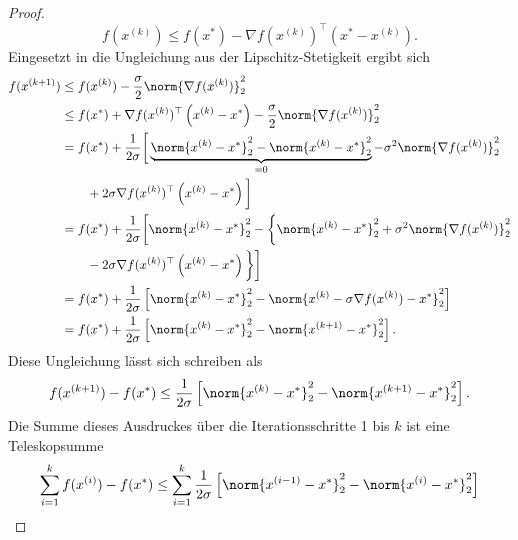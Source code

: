 \begin{proof}
      \begin{equation*}
        f(x^{(k)}) \leq f(x^\ast) - \nabla f(x^{(k)})^\top \left(x^\ast - x^{(k)}\right) \text{.}
      \end{equation*}
      Eingesetzt in die Ungleichung aus der Lipschitz-Stetigkeit ergibt sich
      \begin{gather*}
        			\begin{aligned}
                f(x^{(k+1)}) &  \leq f(x^{(k)}) - \frac{\sigma}{2} \norm{\nabla f(x^{(k)})}^2_2 \\
                & \leq f(x^\ast) + \nabla f(x^{(k)})^\top \left(x^{(k)}-x^\ast\right) - \frac{\sigma}{2} \norm{\nabla f(x^{(k)})}^2_2\\
                & = f(x^\ast) + \frac{1}{2\sigma} \bigg[ \underbrace{\norm{x^{(k)}-x^\ast}^2_2-\norm{x^{(k)}-x^\ast}^2_2}_{=0} - \sigma^2 \norm{\nabla f(x^{(k)})}^2_2 \\
                & \qquad + 2\sigma \nabla f(x^{(k)})^\top \left(x^{(k)}-x^\ast\right) \bigg] \\
                & = f(x^\ast) + \frac{1}{2\sigma} \bigg[ \norm{x^{(k)}-x^\ast}^2_2- \bigg\{ \norm{x^{(k)}-x^\ast}^2_2 + \sigma^2 \norm{\nabla f(x^{(k)})}^2_2 \\
                & \qquad - 2\sigma \nabla f(x^{(k)})^\top \left(x^{(k)}-x^\ast\right) \bigg\} \bigg] \\
                & = f(x^\ast) + \frac{1}{2\sigma} \left[ \norm{x^{(k)}-x^\ast}^2_2 - \norm{x^{(k)}-\sigma \nabla f(x^{(k)})-x^\ast}^2_2\right] \\
                & = f(x^\ast) + \frac{1}{2\sigma} \left[ \norm{x^{(k)}-x^\ast}^2_2 - \norm{x^{(k+1)}-x^\ast}^2_2\right] \text{.}\\
        			\end{aligned}
      	\end{gather*}
        Diese Ungleichung lässt sich schreiben als
        \begin{equation*}
          f(x^{(k+1)})-f(x^\ast) \leq \frac{1}{2\sigma} \left[ \norm{x^{(k)}-x^\ast}^2_2 - \norm{x^{(k+1)}-x^\ast}^2_2\right] \text{.} \end{equation*}
        Die Summe dieses Ausdruckes über die Iterationsschritte 1 bis $k$ ist eine Teleskopsumme
        \begin{gather*}
          			\begin{aligned}
                  \sum_{i=1}^k f(x^{(i)})-f(x^\ast) & \leq \sum_{i=1}^k \frac{1}{2\sigma} \left[ \norm{x^{(i-1)}-x^\ast}^2_2 - \norm{x^{(i)}-x^\ast}^2_2\right] \\

\end{aligned}
\end{gather*}
\end{proof}
